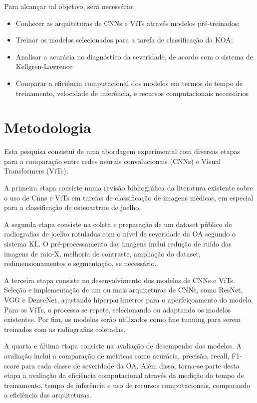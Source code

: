Para alcançar tal objetivo, será necessário:
\begin{itemize}
    \item Conhecer as arquiteturas de CNNs e ViTs através modelos pré-treinados;
    \item Treinar os modelos selecionados para a tarefa de classificação da KOA;
    \item Analisar a acurácia no diagnóstico da severidade, de acordo com o sistema de Kellgren-Lawrence
    \item Comparar a eficiência computacional dos modelos em termos de tempo de treinamento, velocidade de inferência, e recursos computacionais necessários
\end{itemize}

\section*{Metodologia}\label{sec:metodologia}

Esta pesquisa consistui de uma abordagem experimental com diversas etapas para a comparação entre redes neurais convolucionais (CNNs) e Visual Transformers (ViTs).

A primeira etapa consiste numa revisão bibliográfica da literatura existente sobre o uso de Cnns e ViTs em tarefas de classificação de imagens médicas, em especial para a classificação de osteoartrite de joelho.

A segunda etapa consiste na coleta e preparação de um dataset público de radiografias de joelho rotuladas com o nível de severidade da OA segundo o sistema KL. O pré-processamento das imagens inclui redução de ruído das imagens de raio-X, melhoria de contraste, ampliação do dataset, redimensionamentos e segmentação, se necessário.

A terceira etapa consiste no desenvolvimento dos modelos de CNNs e ViTs. Seleção e implementação de um ou mais arquiteturas de CNNs, como ResNet, VGG e DenseNet, ajustando hiperparâmetros para o aperfeiçoamento do modelo. Para os ViTs, o processo se repete, selecionando ou adaptando os modelos existentes. Por fim, os modelos serão utilizados como fine tunning para serem treinados com as radiografias coletadas.

A quarta e última etapa consiste na avaliação de desempenho dos modelos. A avaliação inclui a comparação de métricas como acurácia, precisão, recall, F1-score para cada classe de severidade da OA. Além disso, torna-se parte desta etapa a avaliação da eficiência computacional através da medição do tempo de treinamento, tempo de inferência e uso de recursos computacionais, comparando a eficiência das arquiteturas.